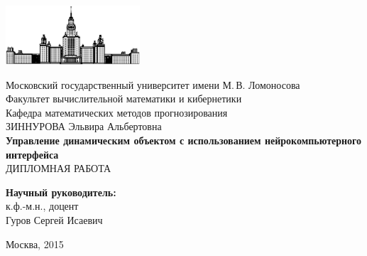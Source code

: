 \documentclass[12pt,a4paper,oneside,fleqn,leqno]{article}
\begin{document}
\begin{titlepage}
\begin{center}
    \includegraphics[width=50mm]{msu.eps}

    \bigskip
	Московский государственный университет имени М.\,В. Ломоносова\\
	Факультет вычислительной математики и кибернетики\\
	Кафедра математических методов прогнозирования\\[20mm]

    {\Large
        ЗИННУРОВА Эльвира Альбертовна\\[10mm]
\textbf{Управление динамическим объектом с использованием нейрокомпьютерного интерфейса}\\[2cm]
	\large ДИПЛОМНАЯ РАБОТА	
    }\\[10mm]

    \vfill

\begin{flushright}
  \textbf{Научный руководитель:}\\
  к.ф.-м.н., доцент\\
  Гуров Сергей Исаевич
\end{flushright}

\vfill

\begin{center}
Москва, 2015
\end{center}

\end{center}
\end{titlepage}

\newpage
\renewcommand{\contentsname}{Содержание}
\tableofcontents

\newpage
\end{document}
